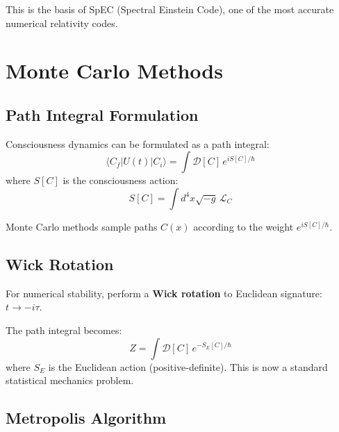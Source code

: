 This is the basis of SpEC (Spectral Einstein Code), one of the most accurate numerical relativity codes.

\section{Monte Carlo Methods}

\subsection{Path Integral Formulation}

Consciousness dynamics can be formulated as a path integral:
\begin{equation}
\langle C_f | U(t) | C_i \rangle = \int \mathcal{D}[C] \, e^{iS[C]/\hbar}
\end{equation}
where $S[C]$ is the consciousness action:
\begin{equation}
S[C] = \int d^4x \sqrt{-g} \, \mathcal{L}_C
\end{equation}

Monte Carlo methods sample paths $C(x)$ according to the weight $e^{iS[C]/\hbar}$.

\subsection{Wick Rotation}

For numerical stability, perform a \textbf{Wick rotation} to Euclidean signature: $t \to -i\tau$.

The path integral becomes:
\begin{equation}
Z = \int \mathcal{D}[C] \, e^{-S_E[C]/\hbar}
\end{equation}
where $S_E$ is the Euclidean action (positive-definite). This is now a standard statistical mechanics problem.

\subsection{Metropolis Algorithm}

